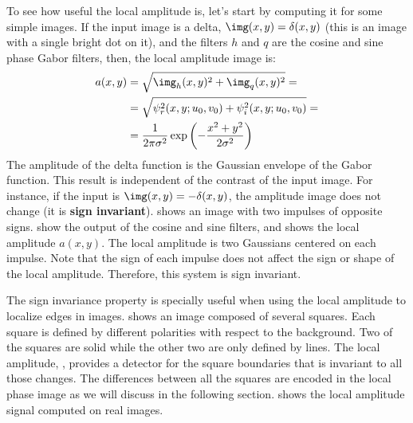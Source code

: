To see how useful the local amplitude is, let's start by computing it for some simple images. If the input image is a delta, $\img(x,y) = \delta(x,y)$ (this is an image with a single bright dot on it), and the filters $h$ and $q$ are the cosine and sine phase Gabor filters, then, the local amplitude image is:
\begin{equation}
	\begin{split}
		a(x,y) & = \sqrt{\img_h(x,y)^2 + \img_q(x,y)^2} =                                    \\
		       & = \sqrt{\psi^2_r(x,y;u_0,v_0) + \psi^2_i(x,y;u_0,v_0)} =                    \\
		       & = \frac{1}{2\pi \sigma^2} \exp{\left(-\frac{x^2 + y^2}{2 \sigma^2} \right)}
	\end{split}
\end{equation}
The amplitude of the delta function is the Gaussian envelope of the Gabor function. This result is independent of the contrast of the input image. For instance, if the input is $\img(x,y) = -\delta(x,y)$, the amplitude image does not change (it is {\bf sign invariant}).  shows an image with two impulses of opposite signs.  show the output of the cosine and sine filters, and  shows the local amplitude $a(x,y)$. The local amplitude is two Gaussians centered on each impulse. Note that the sign of each impulse does not affect the sign or shape of the local amplitude. Therefore, this system is sign invariant.

The sign invariance property is specially useful when using the local amplitude to localize edges in images.   shows an image composed of several squares. Each square is defined by different polarities with respect to the background. Two of the squares are solid while the other two are only defined by lines. The local amplitude, , provides a detector for the square boundaries that is invariant to all those changes. The differences between all the squares are encoded in the local phase image as we will discuss in the following section. \Fig{\ref{fig:gabor_zebra}} shows the local amplitude signal computed on real images.




